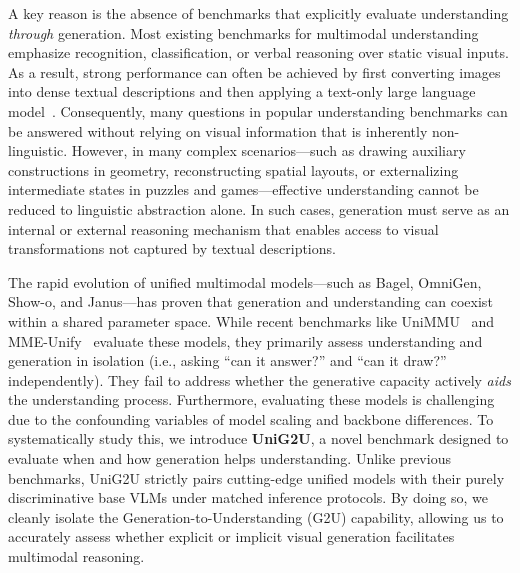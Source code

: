 \documentclass{article}
\theoremstyle{plain}
\theoremstyle{definition}
\theoremstyle{remark}
\begin{document}
A key reason is the absence of benchmarks that explicitly evaluate understanding \emph{through} generation. Most existing benchmarks for multimodal understanding emphasize recognition, classification, or verbal reasoning over static visual inputs. As a result, strong performance can often be achieved by first converting images into dense textual descriptions and then applying a text-only large language model~\cite{xing2025caprl,qiao2024prism}. Consequently, many questions in popular understanding benchmarks can be answered without relying on visual information that is inherently non-linguistic. However, in many complex scenarios—such as drawing auxiliary constructions in geometry, reconstructing spatial layouts, or externalizing intermediate states in puzzles and games—effective understanding cannot be reduced to linguistic abstraction alone. In such cases, generation must serve as an internal or external reasoning mechanism that enables access to visual transformations not captured by textual descriptions.

The rapid evolution of unified multimodal models—such as Bagel, OmniGen, Show-o, and Janus—has proven that generation and understanding can coexist within a shared parameter space. While recent benchmarks like UniMMU~\cite{zou2025unimmmu} and MME-Unify~\cite{xie2025mmeunify} evaluate these models, they primarily assess understanding and generation in isolation (i.e., asking ``can it answer?'' and ``can it draw?'' independently). They fail to address whether the generative capacity actively \emph{aids} the understanding process. Furthermore, evaluating these models is challenging due to the confounding variables of model scaling and backbone differences. To systematically study this, we introduce \textbf{UniG2U}, a novel benchmark designed to evaluate when and how generation helps understanding. Unlike previous benchmarks, UniG2U strictly pairs cutting-edge unified models with their purely discriminative base VLMs under matched inference protocols. By doing so, we cleanly isolate the Generation-to-Understanding (G2U) capability, allowing us to accurately assess whether explicit or implicit visual generation facilitates multimodal reasoning.
\end{document}
